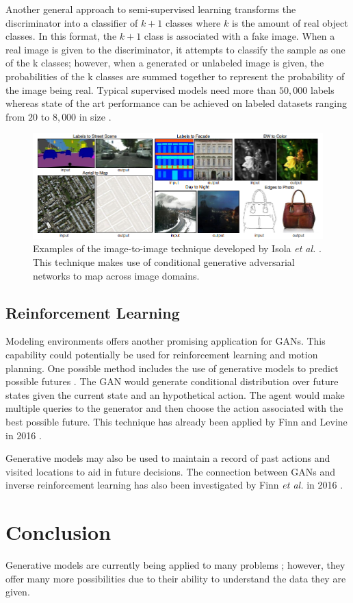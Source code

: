 \documentclass[11pt]{article}
\begin{document}
Another general approach to semi-supervised learning transforms the discriminator into a classifier of $k + 1$ classes where $k$ is the amount of real object classes. In this format, the $k + 1$ class is associated with a fake image. When a real image is given to the discriminator, it attempts to classify the sample as one of the k classes; however, when a generated or unlabeled image is given, the probabilities of the k classes are summed together to represent the probability of the image being real. Typical supervised models need more than $50,000$ labels whereas state of the art performance can be achieved on labeled datasets ranging from $20$ to $8,000$ in size \citep{2017arXiv170100160G}.

\begin{figure}
\centering
\includegraphics[scale=0.55]{img2img}
\caption{Examples of the image-to-image technique developed by Isola \textit{et al.} \citep{2016arXiv161107004I}. This technique makes use of conditional generative adversarial networks to map across image domains.}
\label{fig:img2img}
\end{figure}

\subsection{Reinforcement Learning}
Modeling environments offers another promising application for GANs. This capability could potentially be used for reinforcement learning and motion planning. One possible method includes the use of generative models to predict possible futures \citep{2017arXiv170100160G}. The GAN would generate conditional distribution over future states given the current state and an hypothetical action. The agent would make multiple queries to the generator and then choose the action associated with the best possible future. This technique has already been applied by Finn and Levine in 2016 \citep{2016arXiv161000696F}.

Generative models may also be used to maintain a record of past actions and visited locations to aid in future decisions. The connection between GANs and inverse reinforcement learning has also been investigated by Finn \textit{et al.} in 2016 \citep{2016arXiv161103852F}.



\section{Conclusion}
Generative models are currently being applied to many problems \citep{genmodelingopenai}; however, they offer many more possibilities due to their ability to understand the data they are given.



\end{document}
